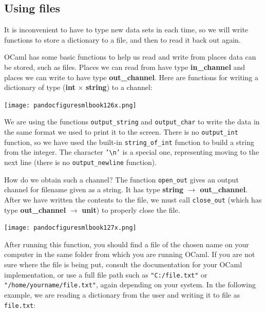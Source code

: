 \documentclass[]{book}
\begin{document}
\subsection*{Using files}

It is inconvenient to have to type new data sets in each time, so we will write functions to store a dictionary to a file, and then to read it back out again. 

OCaml has some basic functions to help us read and write from places data can be stored, such as files. Places we can read from have type \textsf{\textbf{in\_channel}} and places we can write to have type \textsf{\textbf{out\_channel}}. Here are functions for writing a dictionary of type \textsf{\textmd{(}\textbf{int} $\times$ \textbf{string}\textmd{)}} to a channel: 

\medskip
\begin{center}
\noindent\texttt{[image: pandocfiguresmlbook126x.png]}
\end{center}
\medskip

\noindent We are using the functions \texttt{output\_string} and \texttt{output\_char} to write the data in the same format we used to print it to the screen. There is no \texttt{output\_int} function, so we have used the built-in \texttt{string\_of\_int} function to build a string from the integer. The character \texttt{'\textbackslash n'} is a special one, representing moving to the next line (there is no \texttt{output\_newline} function).

How do we obtain such a channel? The function \texttt{open\_out} gives an output channel for filename given as a string. It has type \textsf{\textbf{string $\rightarrow$ out\_channel}}. After we have written the contents to the file, we must call \texttt{close\_out} (which has type \textsf{\textbf{out\_channel} $\rightarrow$ \textbf{unit}}) to properly close the file.


\medskip
\begin{center}
\noindent\texttt{[image: pandocfiguresmlbook127x.png]}
\end{center}
\medskip

\noindent After running this function, you should find a file of the chosen name on your computer in the same folder from which you are running OCaml. If you are not sure where the file is being put, consult the documentation for your OCaml implementation, or use a full file path such as \texttt{"C:/file.txt"} or \texttt{"/home/yourname/file.txt"}, again depending on your system. In the following example, we are reading a dictionary from the user and writing it to file as \texttt{file.txt}:
\end{document}
